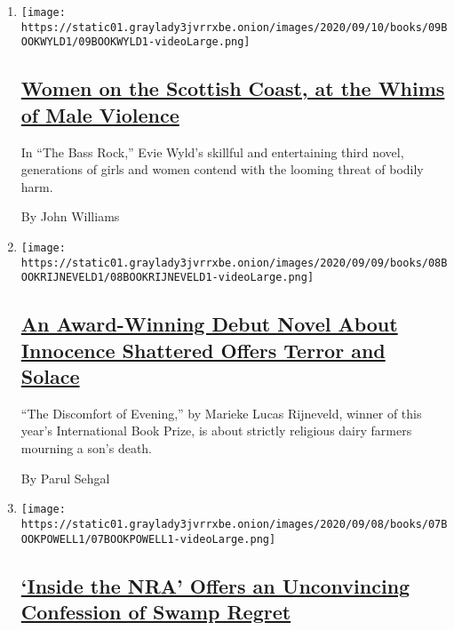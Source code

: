 \begin{enumerate}
\def\labelenumi{\arabic{enumi}.}
\item
  \texttt{[image: https://static01.graylady3jvrrxbe.onion/images/2020/09/10/books/09BOOKWYLD1/09BOOKWYLD1-videoLarge.png]}

  \hypertarget{women-on-the-scottish-coast-at-the-whims-of-male-violence}{%
  \subsection{\texorpdfstring{\href{/2020/09/09/books/review-bass-rock-evie-wyld.html}{Women
  on the Scottish Coast, at the Whims of Male
  Violence}}{Women on the Scottish Coast, at the Whims of Male Violence}}\label{women-on-the-scottish-coast-at-the-whims-of-male-violence}}

  In ``The Bass Rock,'' Evie Wyld's skillful and entertaining third
  novel, generations of girls and women contend with the looming threat
  of bodily harm.

  By John Williams
\item
  \texttt{[image: https://static01.graylady3jvrrxbe.onion/images/2020/09/09/books/08BOOKRIJNEVELD1/08BOOKRIJNEVELD1-videoLarge.png]}

  \hypertarget{an-award-winning-debut-novel-about-innocence-shattered-offers-terror-and-solace}{%
  \subsection{\texorpdfstring{\href{/2020/09/08/books/review-discomfort-of-evening-marieke-lucas-rijneveld.html}{An
  Award-Winning Debut Novel About Innocence Shattered Offers Terror and
  Solace}}{An Award-Winning Debut Novel About Innocence Shattered Offers Terror and Solace}}\label{an-award-winning-debut-novel-about-innocence-shattered-offers-terror-and-solace}}

  ``The Discomfort of Evening,'' by Marieke Lucas Rijneveld, winner of
  this year's International Book Prize, is about strictly religious
  dairy farmers mourning a son's death.

  By Parul Sehgal
\item
  \texttt{[image: https://static01.graylady3jvrrxbe.onion/images/2020/09/08/books/07BOOKPOWELL1/07BOOKPOWELL1-videoLarge.png]}

  \hypertarget{inside-the-nra-offers-an-unconvincing-confession-of-swamp-regret}{%
  \subsection{\texorpdfstring{\href{/2020/09/07/books/review-inside-nra-joshua-powell.html}{`Inside
  the NRA' Offers an Unconvincing Confession of Swamp
  Regret}}{`Inside the NRA' Offers an Unconvincing Confession of Swamp Regret}}\label{inside-the-nra-offers-an-unconvincing-confession-of-swamp-regret}}


\end{enumerate}
